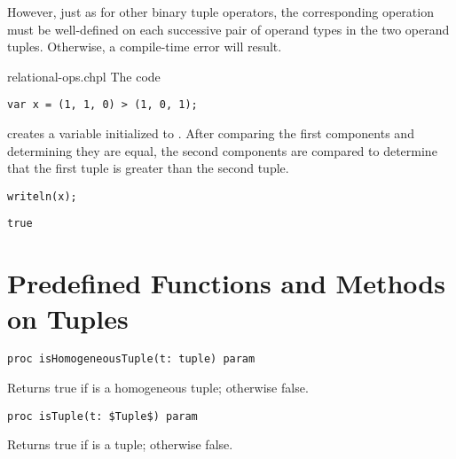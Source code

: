 However, just as for other binary tuple operators, the corresponding operation
must be well-defined on each successive pair of operand types in the two operand
tuples.  Otherwise, a compile-time error will result.

\begin{chapelexample}{relational-ops.chpl}
The code
\begin{chapel}
\begin{verbatim}
var x = (1, 1, 0) > (1, 0, 1);
\end{verbatim}
\end{chapel}
creates a variable initialized to .  After comparing the
first components and determining they are equal, the second components
are compared to determine that the first tuple is greater than the
second tuple.
\begin{chapelpost}
\begin{verbatim}
writeln(x);
\end{verbatim}
\end{chapelpost}
\begin{chapeloutput}
\begin{verbatim}
true
\end{verbatim}
\end{chapeloutput}
\end{chapelexample}

\section{Predefined Functions and Methods on Tuples}
\label{Predefined_Functions_and_Methods_on_Tuples}

\begin{protohead}
\begin{verbatim}
proc isHomogeneousTuple(t: tuple) param
\end{verbatim}
\end{protohead}
\begin{protobody}
Returns true if  is a homogeneous tuple; otherwise false.
\end{protobody}

\begin{protohead}
\begin{verbatim}
proc isTuple(t: $Tuple$) param
\end{verbatim}
\end{protohead}
\begin{protobody}
Returns true if  is a tuple; otherwise false.
\end{protobody}


